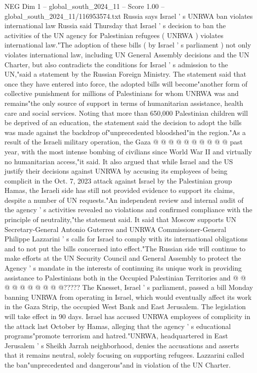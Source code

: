 \begin{textsample}{NEG Dim 1 – global\_south\_2024\_11 – Score 1.00 – global\_south\_2024\_11/116953574.txt}  \label{ex:f1_neg_278}
Russia says Israel ' s UNRWA ban violates international law Russia said Thursday that Israel ' s decision to ban the activities of the UN agency for Palestinian refugees ( UNRWA ) violates international law."The adoption of these bills ( by Israel ' s parliament ) not only violates international law, including UN General Assembly decisions and the UN Charter, but also contradicts the conditions for Israel ' s admission to the UN,"said a statement by the Russian Foreign Ministry.
The statement said that once they have entered into force, the adopted bills will become"another form of collective punishment for millions of Palestinians for whom UNRWA was and remains"the only source of support in terms of humanitarian assistance, health care and social services.
Noting that more than 650,000 Palestinian children will be deprived of an education, the statement said the decision to adopt the bills was made against the backdrop of"unprecedented bloodshed"in the region."As a result of the Israeli military operation, the Gaza @ @ @ @ @ @ @ @ @ @ past year, with the most intense bombing of civilians since World War II and virtually no humanitarian access,"it said.
It also argued that while Israel and the US justify their decisions against UNRWA by accusing its employees of being complicit in the Oct. 7, 2023 attack against Israel by the Palestinian group Hamas, the Israeli side has still not provided evidence to support its claims, despite a number of UN requests."An independent review and internal audit of the agency ' s activities revealed no violations and confirmed compliance with the principle of neutrality,"the statement said.
It said that Moscow supports UN Secretary-General Antonio Guterres and UNRWA Commissioner-General Philippe Lazzarini ' s calls for Israel to comply with its international obligations and to not put the bills concerned into effect."The Russian side will continue to make efforts at the UN Security Council and General Assembly to protect the Agency ' s mandate in the interests of continuing its unique work in providing assistance to Palestinians both in the Occupied Palestinian Territories and @ @ @ @ @ @ @ @ @ @?????
The Knesset, Israel ' s parliament, passed a bill Monday banning UNRWA from operating in Israel, which would eventually affect its work in the Gaza Strip, the occupied West Bank and East Jerusalem.
The legislation will take effect in 90 days.
Israel has accused UNRWA employees of complicity in the attack last October by Hamas, alleging that the agency ' s educational programs"promote terrorism and hatred."UNRWA, headquartered in East Jerusalem ' s Sheikh Jarrah neighborhood, denies the accusations and asserts that it remains neutral, solely focusing on supporting refugees.
Lazzarini called the ban"unprecedented and dangerous"and in violation of the UN Charter.

\end{textsample}
